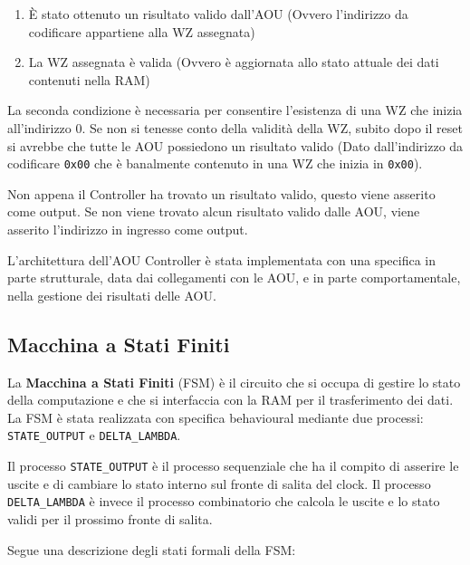 \documentclass{article}
\begin{document}
\begin{enumerate}
\item È stato ottenuto un risultato valido dall'AOU (Ovvero l'indirizzo da codificare appartiene alla WZ assegnata)
\item La WZ assegnata è valida (Ovvero è aggiornata allo stato attuale dei dati contenuti nella RAM)
\end{enumerate}

La seconda condizione è necessaria per consentire l'esistenza di una WZ che inizia all'indirizzo 0. Se non si tenesse conto della validità della WZ, subito dopo il reset
si avrebbe che tutte le AOU possiedono un risultato valido (Dato dall'indirizzo da codificare \texttt{0x00} che è banalmente contenuto in una WZ che inizia in \texttt{0x00}).

Non appena il Controller ha trovato un risultato valido, questo viene asserito come output. Se non viene trovato alcun risultato valido dalle AOU, viene asserito
l'indirizzo in ingresso come output.

L'architettura dell'AOU Controller è stata implementata con una specifica in parte strutturale, data dai collegamenti con le AOU, e in parte comportamentale,
nella gestione dei risultati delle AOU.

\subsection{Macchina a Stati Finiti}
\label{FSM}

La \textbf{Macchina a Stati Finiti} (FSM) è il circuito che si occupa di gestire lo stato della computazione e che si interfaccia con la RAM per il trasferimento dei dati.
La FSM è stata realizzata con specifica behavioural mediante due processi: \texttt{STATE\_OUTPUT} e \texttt{DELTA\_LAMBDA}.

Il processo \texttt{STATE\_OUTPUT} è il processo sequenziale che ha il compito di asserire le uscite e di cambiare lo stato interno sul fronte di salita del clock.
Il processo \texttt{DELTA\_LAMBDA} è invece il processo combinatorio che calcola le uscite e lo stato validi per il prossimo fronte di salita.

Segue una descrizione degli stati formali della FSM:
\end{document}
